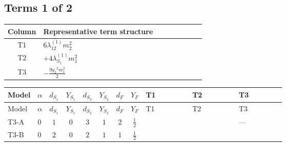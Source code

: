 \documentclass[8pt]{article}
\begin{document}
\begin{landscape}
\subsection*{Terms 1 of 2}
\begin{center}
\begin{tabular}{@{}c >{\raggedright\arraybackslash}p{0.82\linewidth}@{}}
\toprule
Column & Representative term structure \\
\midrule
T1 & \(\displaystyle 6 {\lambda_{12}^{(1)}} {m_2^2}\) \\
\midrule
T2 & \(\displaystyle +4 {\lambda_{S_1}^{(1)}} {m_1^2}\) \\
\midrule
T3 & \(\displaystyle -\frac{9 {g_2}^2 {m_1^2}}{2}\) \\
\midrule
\bottomrule
\end{tabular}
\end{center}
\smallskip
\tiny
\begin{longtable}{@{}llcccccc >{\raggedright\arraybackslash}p{0.21\linewidth} >{\raggedright\arraybackslash}p{0.21\linewidth} >{\raggedright\arraybackslash}p{0.21\linewidth}@{}}
\toprule
Model & $\alpha$ & $d_{S_1}$ & $Y_{S_1}$ & $d_{S_2}$ & $Y_{S_2}$ & $d_F$ & $Y_F$ & T1 & T2 & T3 \\
\midrule
\endfirsthead
\toprule
Model & $\alpha$ & $d_{S_1}$ & $Y_{S_1}$ & $d_{S_2}$ & $Y_{S_2}$ & $d_F$ & $Y_F$ & T1 & T2 & T3 \\
\midrule
\endhead
T3-A & $0$ & $1$ & $0$ & $3$ & $1$ & $2$ & $\frac{1}{2}$ & \scriptsize\adjustbox{max width=\linewidth}{$\begin{gathered} 6 {\lambda_{12}^{(1)}} {m_2^2}\end{gathered}$} & \scriptsize\adjustbox{max width=\linewidth}{$\begin{gathered} +4 {\lambda_{S_1}^{(1)}} {m_1^2}\end{gathered}$} & --- \\
\midrule
T3-B & $0$ & $2$ & $0$ & $2$ & $1$ & $1$ & $\frac{1}{2}$ & \scriptsize\adjustbox{max width=\linewidth}{$\begin{gathered} +4 {\lambda_{12}^{(1)}} {m_2^2}\end{gathered}$} & \scriptsize\adjustbox{max width=\linewidth}{$\begin{gathered} +6 {\lambda_{S_1}^{(1)}} {m_1^2}\end{gathered}$} & \scriptsize\adjustbox{max width=\linewidth}{$\begin{gathered} -\frac{9 {g_2}^2 {m_1^2}}{2}\end{gathered}$} \\

\end{longtable}
\end{landscape}
\end{document}
